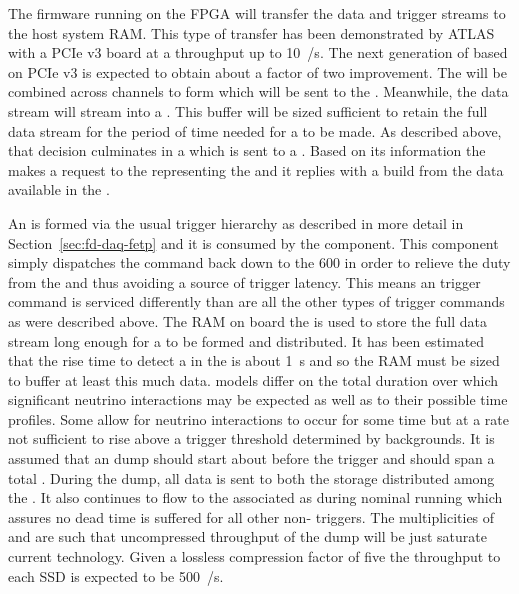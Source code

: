The firmware running on the  FPGA will transfer the data
and trigger streams to the host system RAM. 
This type of transfer has been demonstrated by ATLAS with a PCIe v3
 board at a throughput up to \SI{10}{\GB/\s}. 
The next generation of  based on PCIe v3 is expected to
obtain about a factor of two improvement.
The  will be combined across channels to form
 which will be sent to the .
Meanwhile, the data stream will stream into a . 
This buffer will be sized sufficient to retain the full data stream
for the period of time needed for a  to be made. 
As described above, that decision culminates in a 
which is sent to a . 
Based on its information the  makes a request to the
 representing the  and it replies with a
 build from the data available in the .

An   is formed via the usual trigger
hierarchy as described in more detail in Section~\ref{sec:fd-daq-fetp}
and it is consumed by the  component. 
This component simply dispatches the command back down to the 600
 in order to relieve the duty from the  and
thus avoiding a source of trigger latency.
This means an  trigger command is serviced differently than
are all the other types of trigger commands as were described above.
The RAM on board the  is used to store the full data
stream long enough for a   to be formed
and distributed. 
It has been estimated that the rise time to detect a  in
the   is about \SI{1}{\s} and so the RAM
must be sized to buffer at least this much data.
 models differ on the total duration over which significant
neutrino interactions may be expected as well as to their possible
time profiles. 
Some allow for  neutrino interactions to occur for some
time but at a rate not sufficient to rise above a trigger threshold
determined by  backgrounds. 
It is assumed that an  dump should start about \snbpretime
before the  trigger and should span a total \snbtime.
During the dump, all data is sent to both the  storage
distributed among the . 
It also continues to flow to the associated  as during
nominal running which assures no dead time is suffered for all other
non- triggers. 
The multiplicities of  and  are such that
uncompressed throughput of the  dump will be just saturate
current technology. 
Given a lossless compression factor of five the throughput to each SSD
is expected to be \SI{500}{\MB/\s}.

